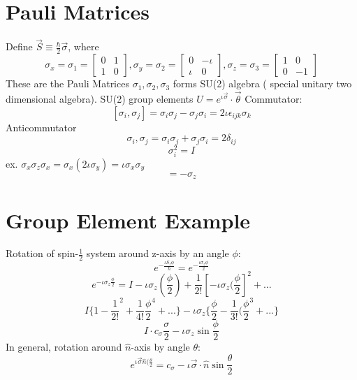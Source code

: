 \documentclass{book}
\begin{document}
\section{Pauli Matrices}
Define $\vec{S} \equiv \frac{\hbar}{2} \vec{\sigma}$, where
$$ \sigma_x = \sigma_1 = \begin{bmatrix}
  0 & 1 \\
  1 & 0
\end{bmatrix},
\sigma_y = \sigma_2 = \begin{bmatrix}
  0 & -\iota \\
  \iota & 0
\end{bmatrix},
\sigma_z = \sigma_3 = \begin{bmatrix}
  1 & 0 \\
  0 & -1
\end{bmatrix}$$
These are the Pauli Matrices
${\sigma_1,\sigma_2,\sigma_3}$ forms SU(2) algebra ( special unitary two dimensional algebra). SU(2) group elements $U = e^{\iota \vec{\sigma}} \cdot \vec{\theta}$
Commutator:
$$[\sigma_i, \sigma	_j] = \sigma_i\sigma_j - \sigma_j\sigma_i = 2\iota \epsilon_{ijk} \sigma_k$$
Anticommutator
$${\sigma_i,\sigma_j} = \sigma_i\sigma_j + \sigma_j\sigma_i = 2\delta_{ij}$$
$$\sigma_i^2 = I$$ 
ex. $ \sigma_x\sigma_z\sigma_x = \sigma_x(2\iota \sigma_y) = \iota \sigma_x \sigma_y$
$$= - \sigma_z$$
\section{Group Element Example}
Rotation of spin-$\frac{1}{2}$ system around z-axis by an angle $\phi$:
$$e^{-\frac{\iota S_z \phi}{\hbar}} = e^{-\frac{\iota \sigma_z \phi}{2}}$$
$$ e^{- \iota \sigma_z \frac{\phi}{2}} = I - \iota \sigma_z (\frac{\phi}{2}) + \frac{1}{2!}[-\iota\sigma_z(\frac{\phi}{2}]^2 + ...$$
$$ I \{1-\frac{1}{2!}^2 + \frac{1}{4!} \frac{\phi}{2}^4 + ...\} - \iota	\sigma_z \{ \frac{\phi}{2} - \frac{1}{3!}(\frac{\phi}{2}^3 + ... \}$$
$$I \cdot c_\sigma \frac{\sigma}{2} - \iota \sigma_z \sin \frac{\phi}{2}$$
In general, rotation around $\hat{n}$-axis by angle $\theta$:
$$ e^{\iota \vec{\sigma} \hat{n}(\frac{\theta}{2}} = c_\sigma - \iota \vec{\sigma} \cdot \hat{n} \sin \frac{\theta}{2}$$
\end{document}
